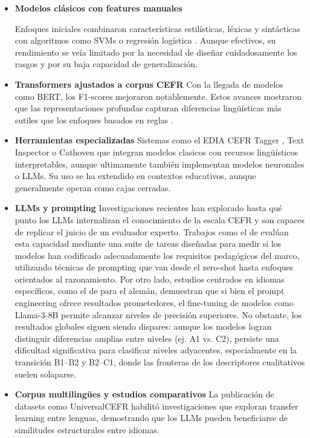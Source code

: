 \begin{itemize}
    \item \textbf{Modelos clásicos con features manuales}
    
    Enfoques iniciales combinaron características estilísticas, léxicas y sintácticas con algoritmos como SVMs o regresión logística \parencite{Xia2019}. Aunque efectivos, su rendimiento se veía limitado por la necesidad de diseñar cuidadosamente los rasgos y por su baja capacidad de generalización.

    \item \textbf{Transformers ajustados a corpus CEFR}
    Con la llegada de modelos como BERT, los F1-scores mejoraron notablemente. Estos avances mostraron que las representaciones profundas capturan diferencias lingüísticas más sutiles que los enfoques basados en reglas \parencite{JulianaSchmalz2021}.

    \item \textbf{Herramientas especializadas}
    Sistemas como el EDIA CEFR Tagger \parencite{edia}, Text Inspector \parencite{text_inspector} o Cathoven \parencite{cathoven} que integran modelos clasicos con recursos lingüísticos interpretables, aunque ultimamente también implementan modelos neuronales o LLMs. Su uso se ha extendido en contextos educativos, aunque generalmente operan como cajas cerradas.

    \item \textbf{LLMs y prompting}
    Investigaciones recientes han explorado hasta qué punto los LLMs internalizan el conocimiento de la escala CEFR y son capaces de replicar el juicio de un evaluador experto. Trabajos como el de \parencite{Benedetto2025} evalúan esta capacidad mediante una suite de tareas diseñadas para medir si los modelos han codificado adecuadamente los requisitos pedagógicos del marco, utilizando técnicas de prompting que van desde el zero-shot hasta enfoques orientados al razonamiento. Por otro lado, estudios centrados en idiomas específicos, como el de \parencite{aleman} para el alemán, demuestran que si bien el prompt engineering ofrece resultados prometedores, el fine-tuning de modelos como Llama-3-8B permite alcanzar niveles de precisión superiores. No obstante, los resultados globales siguen siendo dispares: aunque los modelos logran distinguir diferencias amplias entre niveles (ej. A1 vs. C2), persiste una dificultad significativa para clasificar niveles adyacentes, especialmente en la transición B1–B2 y B2–C1, donde las fronteras de los descriptores cualitativos suelen solaparse.

    \item \textbf{Corpus multilingües y estudios comparativos}
    La publicación de datasets como UniversalCEFR \parencite{Imperial2025} habilitó investigaciones que exploran transfer learning entre lenguas, demostrando que los LLMs pueden beneficiarse de similitudes estructurales entre idiomas.
\end{itemize}

